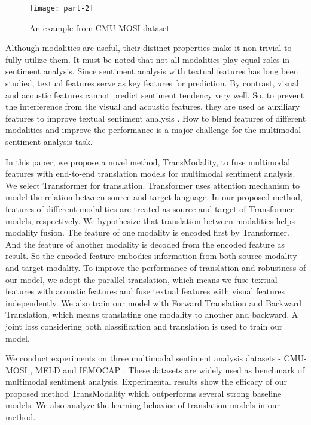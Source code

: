 \documentclass[sigconf]{acmart}
\begin{document}
	\begin{figure}[h]
		\centering
		\texttt{[image: part-2]}
		\caption{An example from CMU-MOSI dataset}
		\label{fig:part}
	\end{figure}

	Although modalities are useful, their distinct properties make it non-trivial to fully utilize them. It must be noted that not all modalities play equal roles in sentiment analysis. Since sentiment analysis with textual features has long been studied, textual features serve as key features for prediction. By contrast, visual and acoustic features cannot predict sentiment tendency very well. So, to prevent the interference from the visual and acoustic features, they are used as auxiliary features to improve textual sentiment analysis \cite{chen2017multimodal}. How to blend features of different modalities and improve the performance is a major challenge for the multimodal sentiment analysis task.
	
	In this paper, we propose a novel method, TransModality, to fuse multimodal features with end-to-end translation models for multimodal sentiment analysis. We select Transformer \cite{vaswani2017attention} for translation. Transformer uses attention mechanism to model the relation between source and target language. In our proposed method, features of different modalities are treated as source and target of Transformer models, respectively. We hypothesize that translation between modalities helps modality fusion. The feature of one modality is encoded first by Transformer. And the feature of another modality is decoded from the encoded feature as result. So the encoded feature embodies information from both source modality and target modality. To improve the performance of translation and robustness of our model, we adopt the parallel translation, which means we fuse textual features with acoustic features and fuse textual features with visual features independently. We also train our model with Forward Translation and Backward Translation, which means translating one modality to another and backward. A joint loss considering both classification and translation is used to train our model.
	
	We conduct experiments on three multimodal sentiment analysis datasets - CMU-MOSI \cite{zadeh2016mosi}, MELD \cite{poria2018meld} and IEMOCAP \cite{busso2008iemocap}. These datasets are widely used as benchmark of multimodal sentiment analysis. Experimental results show the efficacy of our proposed method TransModality which outperforms several strong baseline models. We also analyze the learning behavior of translation models in our method.
	
\end{document}
